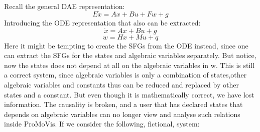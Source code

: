 Recall the general DAE representation:
\begin{equation}
E\dot{x} = Ax + Bu + Fw + g
\end{equation}Introducing the ODE representation that also can be extracted:
\begin{equation}
\dot{x} = Ax + Bu + g
\end{equation}
\begin{equation}
w  = Hx + Mu + q
\end{equation} Here it might be tempting to create the SFGs from the ODE instead, since one can extract the SFGs  for the states and algebraic variables separately. But notice, now the states does not depend at all on the algebraic variables in w. This is still a correct system, since algebraic variables is only a combination of states,other algebraic variables and constants thus can be reduced and replaced by other states and a constant. But even though it is mathematically correct, we have lost information. The causality is broken, and a user that has declared states that depends on algebraic variables can no longer view and analyse such relations inside ProMoVis. If we consider the following, fictional, system:

